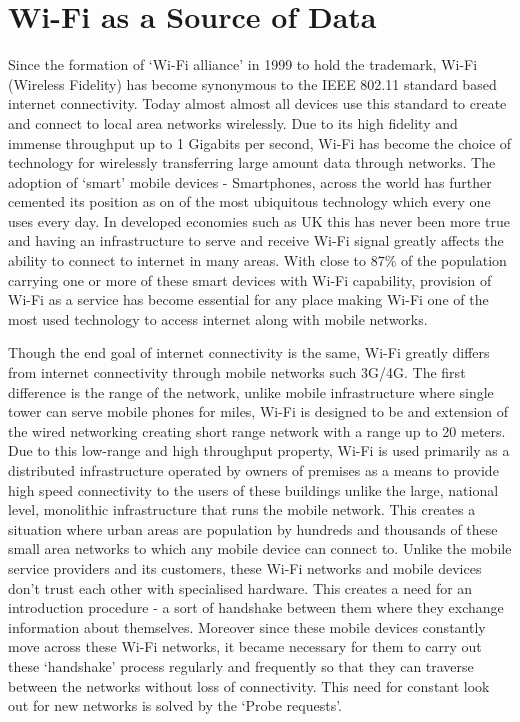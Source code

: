 \section{Wi-Fi as a Source of Data} \label{wifi-as-source-of-data}

Since the formation of `Wi-Fi alliance' in 1999 to hold the trademark, Wi-Fi (Wireless Fidelity) has become synonymous to the IEEE 802.11 standard based internet connectivity.
Today almost almost all devices use this standard to create and connect to local area networks wirelessly.
Due to its high fidelity and immense throughput up to 1 Gigabits per second, Wi-Fi has become the choice of technology for wirelessly transferring large amount data through networks.
The adoption of `smart' mobile devices - Smartphones, across the world has further cemented its position as on of the most ubiquitous technology which every one uses every day.
In developed economies such as UK this has never been more true and having an infrastructure to serve and receive Wi-Fi signal greatly affects the ability to connect to internet in many areas.
With close to 87\%\cite{deloitte2018} of the population carrying one or more of these smart devices with Wi-Fi capability, provision of Wi-Fi as a service has become essential for any place making Wi-Fi one of the most used technology to access internet along with mobile networks.

Though the end goal of internet connectivity is the same, Wi-Fi greatly differs from internet connectivity through mobile networks such 3G/4G.
The first difference is the range of the network, unlike mobile infrastructure where single tower can serve mobile phones for miles, Wi-Fi is designed to be and extension of the wired networking creating short range network with a range up to 20 meters.
Due to this low-range and high throughput property, Wi-Fi is used primarily as a distributed infrastructure operated by owners of premises as a means to provide high speed connectivity to the users of these buildings unlike the large, national level, monolithic infrastructure that runs the mobile network.
This creates a situation where urban areas are population by hundreds and thousands of these small area networks to which any mobile device can connect to.
Unlike the mobile service providers and its customers, these Wi-Fi networks and mobile devices don't trust each other with specialised hardware.
This creates a need for an introduction procedure - a sort of handshake between them where they exchange information about themselves. 
Moreover since these mobile devices constantly move across these Wi-Fi networks, it became necessary for them to carry out these `handshake' process regularly and frequently so that they can traverse between the networks without loss of connectivity.
This need for constant look out for new networks is solved by the `Probe requests'.


